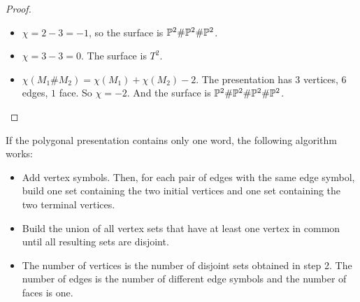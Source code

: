 \begin{proof}
\mbox{}
\begin{itemize}
\item $\chi=2-3=-1$, so the surface is $\P^2\#\P^2\#\P^2$.
\item $\chi=3-3=0$. The surface is $T^2$.
\item $\chi(M_1\#M_2)=\chi(M_1)+\chi(M_2)-2$. The presentation has $3$ vertices, $6$ edges, $1$ face. So $\chi=-2$. And the surface is $\P^2\#\P^2\#\P^2\#\P^2$.
\end{itemize}
\end{proof}
\begin{remark}
If the polygonal presentation contains only one word, the following algorithm works:
\begin{itemize}
\item Add vertex symbols. Then, for each pair of edges with the same edge symbol, build one set containing the two initial vertices and one set containing the two terminal vertices.
\item Build the union of all vertex sets that have at least one vertex in common until all resulting sets are disjoint.
\item The number of vertices is the number of disjoint sets obtained in step 2. The number of edges is the number of different edge symbols and the number of faces is one.
\end{itemize}
\end{remark}